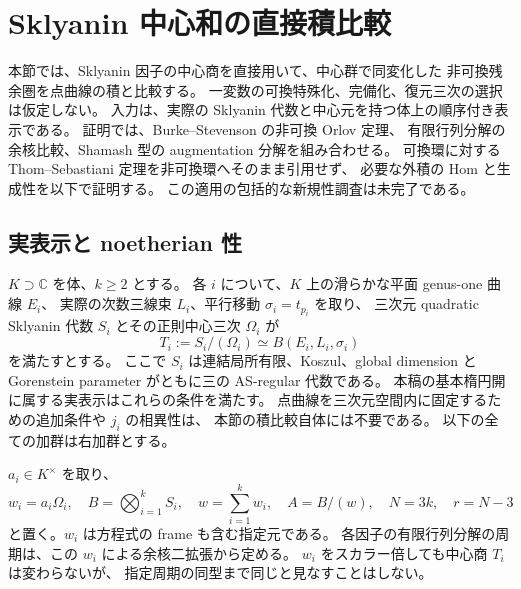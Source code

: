 \section{Sklyanin 中心和の直接積比較}
\label{mbnp:sec:product}

本節では、Sklyanin 因子の中心商を直接用いて、中心群で同変化した
非可換残余圏を点曲線の積と比較する。
一変数の可換特殊化、完備化、復元三次の選択は仮定しない。
入力は、実際の Sklyanin 代数と中心元を持つ体上の順序付き表示である。
証明では、Burke--Stevenson の非可換 Orlov 定理、
有限行列分解の余核比較、Shamash 型の augmentation 分解を組み合わせる。
可換環に対する Thom--Sebastiani 定理を非可換環へそのまま引用せず、
必要な外積の Hom と生成性を以下で証明する。
この適用の包括的な新規性調査は未完了である。

\subsection{実表示と noetherian 性}

$K\supset\mathbb C$ を体、$k\geq2$ とする。
各 $i$ について、$K$ 上の滑らかな平面 genus-one 曲線 $E_i$、
実際の次数三線束 $L_i$、平行移動 $\sigma_i=t_{p_i}$ を取り、
三次元 quadratic Sklyanin 代数 $S_i$ とその正則中心三次 $\Omega_i$ が
\begin{equation}\label{mbnp:eq:factor-data}
 T_i:=S_i/(\Omega_i)\simeq B(E_i,L_i,\sigma_i)
\end{equation}
を満たすとする。
ここで $S_i$ は連結局所有限、Koszul、global dimension と
Gorenstein parameter がともに三の AS-regular 代数である。
本稿の基本楕円開に属する実表示はこれらの条件を満たす。
点曲線を三次元空間内に固定するための追加条件や $j_i$ の相異性は、
本節の積比較自体には不要である。
以下の全ての加群は右加群とする。

$a_i\in K^\times$ を取り、
\begin{equation}\label{mbnp:eq:sum-data}
 w_i=a_i\Omega_i,\quad B=\bigotimes_{i=1}^kS_i,\quad
 w=\sum_{i=1}^kw_i,\quad A=B/(w),\quad N=3k,\quad r=N-3
\end{equation}
と置く。$w_i$ は方程式の frame も含む指定元である。
各因子の有限行列分解の周期は、この $w_i$ による余核二拡張から定める。
$w_i$ をスカラー倍しても中心商 $T_i$ は変わらないが、
指定周期の同型まで同じと見なすことはしない。

